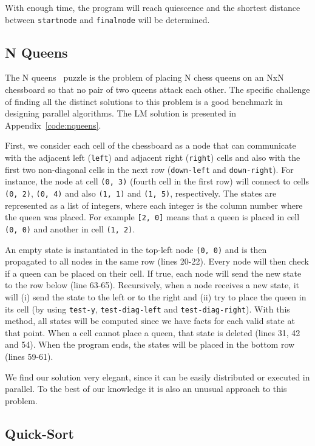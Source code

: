 With enough time, the program will reach quiescence and the shortest distance between \texttt{startnode} and \texttt{finalnode}
will be determined.

\subsection{N Queens}

The N queens~\cite{8queens} puzzle is the problem of placing N chess queens on an NxN chessboard so
that no pair of two queens attack each other. The specific challenge of finding all the distinct
solutions to this problem is a good benchmark in designing parallel algorithms. The LM solution is presented
in Appendix~\ref{code:nqueens}.

First, we consider each cell of the chessboard as a node that can communicate with the adjacent left
(\texttt{left}) and adjacent right (\texttt{right}) cells and also with the first two non-diagonal cells in the next row
(\texttt{down-left} and \texttt{down-right}). For instance, the node at cell \texttt{(0,~3)} (fourth cell in the first row) will connect
to cells \texttt{(0,~2)}, \texttt{(0,~4)} and also \texttt{(1,~1)} and \texttt{(1,~5)}, respectively. The states are represented as a list
of integers, where each integer is the column number where the queen was placed. For example \texttt{[2, 0]}
means that a queen is placed in cell \texttt{(0,~0)} and another in cell \texttt{(1,~2)}.

An empty state is instantiated in the top-left node \texttt{(0,~0)} and is then propagated to all nodes in the same row (lines 20-22).
Every node will then check if a queen can be placed on their cell. If true, each node will send the new
state to the row below (line 63-65).
Recursively, when a node receives a new state, it will (i) send the state to the left
or to the right and (ii) try to place the queen in its cell (by using \texttt{test-y}, \texttt{test-diag-left} and \texttt{test-diag-right}). With this method,
all states will be computed since we have facts for each valid state
at that point. When a cell cannot place a queen, that state is deleted (lines 31, 42 and 54).
When the program ends, the states will be placed in the bottom row (lines 59-61).

We find our solution very elegant, since it can be easily distributed or executed in parallel.
To the best of our knowledge it is also an unusual approach to this problem.

\subsection{Quick-Sort}

